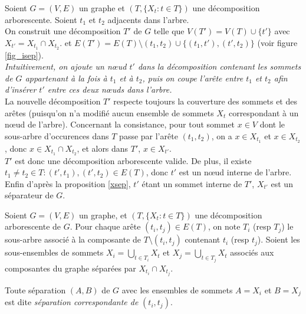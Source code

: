 	Soient $G = (V,E)$ un graphe et $(T,\{X_t : t\in T\})$ une décomposition arborescente.
	Soient $t_1$ et $t_2$ adjacents dans l'arbre.
	\\
	On construit une décomposition $T'$ de $G$ telle que $V(T') = V(T) \cup \{t'\}$ avec
	$X_{t'} = X_{t_1} \cap X_{t_2}$.
	et $E(T') = E(T) \setminus (t_1,t_2) \cup \{(t_1,t'),(t',t_2)\}$
	(voir figure \ref{fig_isep}).
	\\
	{\em Intuitivement,
	on ajoute un n\oe ud $t'$ dans la décomposition contenant les sommets de $G$
	appartenant à la fois à $t_1$ et à $t_2$,
	puis on coupe l'arête entre $t_1$ et $t_2$ afin d'insérer $t'$ entre ces deux
	n\oe uds dans l'arbre. }
	\\
	La nouvelle décomposition $T'$ respecte
	toujours la couverture des sommets et des arêtes (puisqu'on n'a
	modifié aucun ensemble de sommets $X_t$ correspondant à un n\oe ud de l'arbre).
	Concernant la consistance, pour tout sommet $x \in V$ dont le sous-arbre d'occurences
	dans $T$ passe par l'arête $(t_1,t_2)$, on a $x \in X_{t_1}$ et $x \in X_{t_2}$,
	donc $x \in X_{t_1} \cap X_{t_2}$, et alors dans $T'$, $x \in X_{t'}$.
	\\
	$T'$ est donc une décomposition arborescente valide.
	De plus, il existe $t_1 \neq t_2 \in T : (t',t_1),(t',t_2) \in E(T)$, donc $t'$
	est un n\oe ud interne de l'arbre.
	Enfin d'après la proposition \ref{xsep}, $t'$ étant un sommet interne
	de $T'$, $X_{t'}$ est un séparateur de $G$.

	Soient $G = (V,E)$ un graphe, et $(T,\{X_t : t \in T\})$ une décomposition arborescente
	de $G$. Pour chaque arête $(t_i,t_j) \in E(T)$, on note $T_i$ (resp $T_j$) le sous-arbre
	associé à la composante de $T \setminus (t_i,t_j)$ contenant $t_i$ (resp $t_j$).
	Soient les sous-ensembles de sommets $X_i = \bigcup\limits_{t\in T_i}X_t$ et
	$X_j = \bigcup\limits_{t\in T_j}X_t$ associés aux composantes du graphe séparées
	par $X_{t_i} \cap X_{t_j}$.
	
	Toute séparation $(A,B)$ de $G$ avec les ensembles de sommets $A = X_i$ et
	$B = X_j$ est dite {\em séparation correspondante de } $(t_i,t_j)$.

